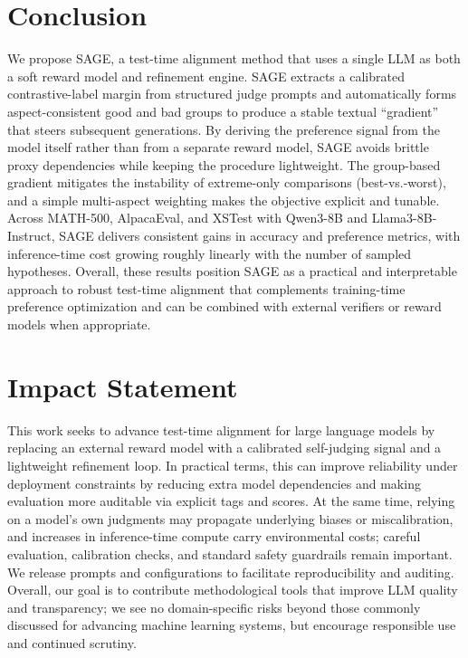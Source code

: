 \documentclass{article}
\theoremstyle{plain}
\theoremstyle{definition}
\theoremstyle{remark}
\newcommand{\method}{SAGE} %
\begin{document}
\section{Conclusion}
\noindent We propose \method{}, a test-time alignment method that uses a single LLM as both a soft reward model and refinement engine. \method{} extracts a calibrated contrastive-label margin from structured judge prompts and automatically forms aspect-consistent good and bad groups to produce a stable textual ``gradient'' that steers subsequent generations. By deriving the preference signal from the model itself rather than from a separate reward model, \method{} avoids brittle proxy dependencies while keeping the procedure lightweight. The group-based gradient mitigates the instability of extreme-only comparisons (best-vs.-worst), and a simple multi-aspect weighting makes the objective explicit and tunable. Across MATH-500, AlpacaEval, and XSTest with Qwen3-8B and Llama3-8B-Instruct, \method{} delivers consistent gains in accuracy and preference metrics, with inference-time cost growing roughly linearly with the number of sampled hypotheses. Overall, these results position \method{} as a practical and interpretable approach to robust test-time alignment that complements training-time preference optimization and can be combined with external verifiers or reward models when appropriate.


\section*{Impact Statement}
\noindent This work seeks to advance test-time alignment for large language models by replacing an external reward model with a calibrated self-judging signal and a lightweight refinement loop. In practical terms, this can improve reliability under deployment constraints by reducing extra model dependencies and making evaluation more auditable via explicit tags and scores. At the same time, relying on a model’s own judgments may propagate underlying biases or miscalibration, and increases in inference-time compute carry environmental costs; careful evaluation, calibration checks, and standard safety guardrails remain important. We release prompts and configurations to facilitate reproducibility and auditing. Overall, our goal is to contribute methodological tools that improve LLM quality and transparency; we see no domain-specific risks beyond those commonly discussed for advancing machine learning systems, but encourage responsible use and continued scrutiny.
\end{document}
